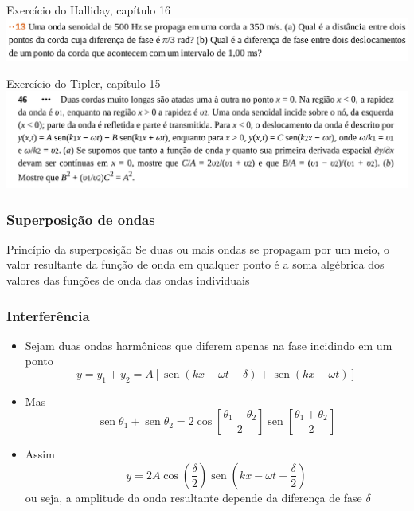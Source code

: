 \documentclass[t,%
brazilian,%
11pt,%
aspectratio=169,%
table%
]{beamer}
\DeclareMathOperator{\sen}{sen}
\begin{document}
\begin{frame}
    \begin{block}{Exercício do Halliday, capítulo 16}
        \includegraphics[width=\textwidth]{images/Captura de tela de 2024-06-18 08-41-37.png}
    \end{block}

    \begin{block}{Exercício do Tipler, capítulo 15}
        \includegraphics[width=\textwidth]{images/Captura de tela de 2024-06-18 08-57-22.png}
    \end{block}
\end{frame}

\begin{frame}[c]
    \frametitle{Superposição de ondas}

    \begin{block}{Princípio da superposição}
        Se duas ou mais ondas se propagam por um meio, o valor resultante da função de onda em qualquer ponto é a soma algébrica dos valores
        das funções de onda das ondas individuais
    \end{block}
\end{frame}

\begin{frame}
    \frametitle{Interferência}

    \begin{itemize}
        \item Sejam duas ondas harmônicas que diferem apenas na fase incidindo em um ponto
            \[
                y=y_1 + y_2 = A \left[ \sen{(kx -\omega t + \delta)} + \sen{(kx -\omega t)} \right]
            \]
        \item Mas 
            \[
                \sen{\theta_1} + \sen{\theta_2} = 
                2\cos{\left[\frac{\theta_1 - \theta_2}{2}\right]}
                \sen{\left[\frac{\theta_1 + \theta_2}{2}\right]}
            \]
        \item Assim
            \[
                y=2A
                \cos{\left(\frac{\delta}{2}\right)}
                \sen{\left(kx -\omega t + \frac{\delta}{2}\right)}
            \]
            ou seja, a amplitude da onda resultante depende da diferença de fase \(\delta\)
    \end{itemize}
\end{frame}
\end{document}
